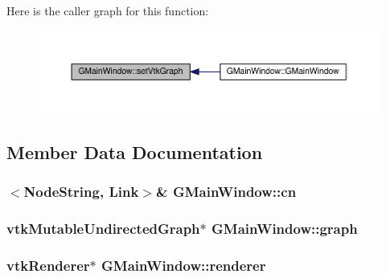 Here is the caller graph for this function\+:
\nopagebreak
\begin{figure}[H]
\begin{center}
\leavevmode
\includegraphics[width=350pt]{class_g_main_window_a464bcf8c3f6ec788398c275ff4bd800d_icgraph}
\end{center}
\end{figure}




\subsection{Member Data Documentation}
\hypertarget{class_g_main_window_aa5824bd346a8a612ed3792a6ce7faf50}{
\subsubsection[{cn}]{$<${\bf Node\+String}, {\bf Link}$>$\& G\+Main\+Window\+::cn\hspace{0.3cm}{\ttfamily [private]}}}\label{class_g_main_window_aa5824bd346a8a612ed3792a6ce7faf50}
\hypertarget{class_g_main_window_ab97c0cde05fda7d301306e82daaeab57}{
\subsubsection[{graph}]{\setlength{\rightskip}{0pt plus 5cm}vtk\+Mutable\+Undirected\+Graph$\ast$ G\+Main\+Window\+::graph\hspace{0.3cm}{\ttfamily [private]}}}\label{class_g_main_window_ab97c0cde05fda7d301306e82daaeab57}
\hypertarget{class_g_main_window_a691d66ce40f6c4782519f50be5e70654}{
\subsubsection[{renderer}]{\setlength{\rightskip}{0pt plus 5cm}vtk\+Renderer$\ast$ G\+Main\+Window\+::renderer\hspace{0.3cm}{\ttfamily [private]}}}\label{class_g_main_window_a691d66ce40f6c4782519f50be5e70654}
